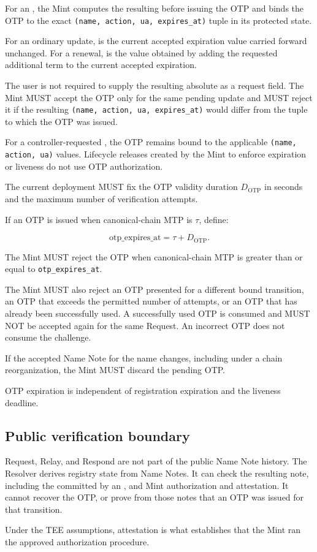 For an , the Mint computes the resulting  before issuing the OTP and binds the OTP to the exact \texttt{(name, action, ua, expires\_at)} tuple in its protected state.

For an ordinary update,  is the current accepted expiration value carried forward unchanged. For a renewal,  is the value obtained by adding the requested additional term to the current accepted expiration.

The user is not required to supply the resulting absolute  as a request field. The Mint MUST accept the OTP only for the same pending update and MUST reject it if the resulting \texttt{(name, action, ua, expires\_at)} would differ from the tuple to which the OTP was issued.

For a controller-requested , the OTP remains bound to the applicable \texttt{(name, action, ua)} values. Lifecycle releases created by the Mint to enforce expiration or liveness do not use OTP authorization.

The current \zns{} deployment MUST fix the OTP validity duration $D_{\text{OTP}}$ in seconds and the maximum number of verification attempts.

If an OTP is issued when canonical-chain MTP is $\tau$, define:

$$\text{otp\_expires\_at} = \tau + D_{\text{OTP}}.$$

The Mint MUST reject the OTP when canonical-chain MTP is greater than or equal to \texttt{otp\_expires\_at}.

The Mint MUST also reject an OTP presented for a different bound transition, an OTP that exceeds the permitted number of attempts, or an OTP that has already been successfully used. A successfully used OTP is consumed and MUST NOT be accepted again for the same Request. An incorrect OTP does not consume the challenge.

If the accepted Name Note for the name changes, including under a chain reorganization, the Mint MUST discard the pending OTP.

OTP expiration is independent of registration expiration and the liveness deadline.

\subsection{Public verification boundary}

Request, Relay, and Respond are not part of the public Name Note history. The Resolver derives registry state from Name Notes. It can check the resulting note, including the  committed by an , and Mint authorization and attestation. It cannot recover the OTP, or prove from those notes that an OTP was issued for that transition.

Under the TEE assumptions, attestation is what establishes that the Mint ran the approved authorization procedure.
